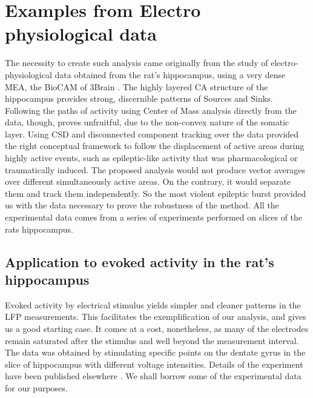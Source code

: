 \documentclass[11pt, letterpaper]{article}
\begin{document}
 
\section{Examples from Electro physiological data}

The necessity to create such analysis came originally from the study of
electro-physiological data obtained from the rat's hippocampus, using
a very dense MEA, the BioCAM of 3Brain \cite{BioCam}. 
The highly layered CA structure of the hippocampus provides strong, discernible patterns of Sources and Sinks. Following the paths of activity using Center of Mass analysis directly from the data, though, proves unfruitful, due to the non-convex nature of the somatic layer. Using CSD and disconnected component tracking over the data provided the right conceptual framework to follow the displacement of active areas during highly active events, such as epileptic-like activity that was pharmacological
or traumatically induced. The proposed analysis would not produce vector averages over different simultaneously active areas. On the contrary, it would separate them and track them independently. So the most violent epileptic burst provided us with the data necessary to prove the robustness of the method.
All the experimental data comes from a series of experiments
performed on slices of the rats hippocampus. 



\subsection{Application to evoked activity in the rat's hippocampus}\label{sec:evocada}

Evoked activity by electrical stimulus yields simpler and cleaner patterns in the LFP
measurements. This facilitates the exemplification of our analysis, and gives us
a good starting case. It comes at a cost, nonetheless, as many of the electrodes
remain saturated after the stimulus and well beyond the measurement interval.
The data was obtained by stimulating  specific points on the dentate gyrus
in the slice of hippocampus with different voltage intensities. Details of the experiment
have been published elsewhere \cite{Franco2018}. We shall borrow some of
the experimental data for our purposes.
\end{document}

